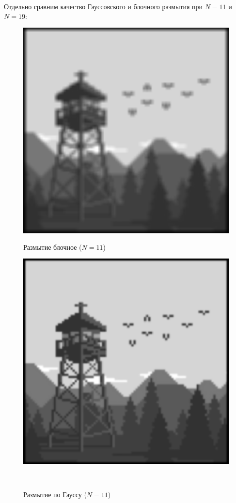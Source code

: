 \documentclass[a4paper]{article}
\begin{document}
Отдельно сравним качество Гауссовского и блочного размытия при $N = 11$ и $N = 19$:

\begin{figure}[H]
    \begin{minipage}{0.49\textwidth}
        \centering \includegraphics[width=\textwidth]{2/11_img_block_by_conv2.png}
        \caption{Размытие блочное ($N = 11$)}
    \end{minipage}\hfill
    \begin{minipage}{0.49\textwidth}
        \centering \includegraphics[width=\textwidth]{2/11_img_gaussian_by_conv2.png}
        \caption{Размытие по Гауссу ($N = 11$)}
    \end{minipage}\\[1em]
\end{figure}\noindent\
\end{document}
